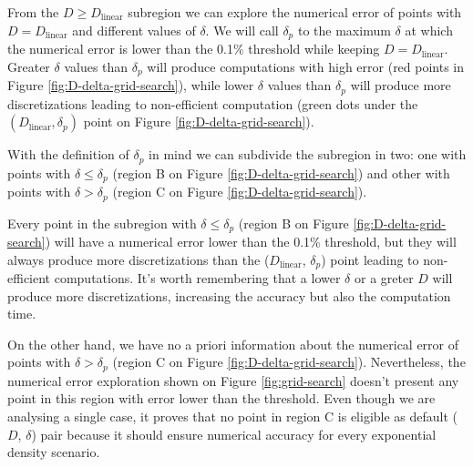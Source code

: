 \documentclass[extra]{gji}
\begin{document}
From the $D \ge D_\text{linear}$ subregion we can explore the numerical 
error of points with $D = D_\text{linear}$ and different values of 
$\delta$.
We will call $\delta_p$ to the maximum $\delta$ at which the numerical 
error is lower than the 0.1\% threshold while keeping
$D = D_ \text{linear}$.
Greater $\delta$ values than $\delta_p$ will produce computations with 
high error (red points in Figure \ref{fig:D-delta-grid-search}), while 
lower $\delta$ values than $\delta_p$ will produce more discretizations 
leading to non-efficient computation (green dots under the 
$(D_\text{linear}, \delta_p)$ point on Figure \ref{fig:D-delta-grid-search}).

With the definition of $\delta_p$ in mind we can subdivide the 
subregion in two: one with points with $\delta \le \delta_p$ (region B 
on Figure \ref{fig:D-delta-grid-search}) and other with points with 
$\delta > \delta_p$ (region C on Figure \ref{fig:D-delta-grid-search}).


Every point in the subregion with $\delta \le \delta_p$ (region B on 
Figure \ref{fig:D-delta-grid-search}) will have a numerical error lower 
than the 0.1\% threshold, but they will always produce more 
discretizations than the ($D_\text{linear}$, $\delta_p$) point leading 
to non-efficient computations.
It's worth remembering that a lower $\delta$ or a greter $D$ will 
produce more discretizations, increasing the accuracy but also the 
computation time.

On the other hand, we have no a priori information about the numerical 
error of points with $\delta > \delta_p$ (region C on 
Figure \ref{fig:D-delta-grid-search}).
Nevertheless, the numerical error exploration shown on
Figure \ref{fig:grid-search} doesn't present any 
point in this region with error lower than the threshold.
Even though we are analysing a single case, it proves that no point in 
region C is eligible as default ($D$, $\delta$) pair because it should 
ensure numerical accuracy for every exponential density scenario.
\end{document}
